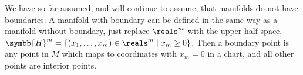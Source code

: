 \documentclass[fleqn]{NotesClass}
\begin{document}
    \begin{remark}{}{}
        We have so far assumed, and will continue to assume, that manifolds do not have boundaries.
        A manifold with boundary can be defined in the same way as a manifold without boundary, just replace \(\reals^m\) with the upper half space, \(\symbb{H}^m = \{(x_1, \dotsc, x_m) \in \reals^m \mid x_m \ge 0\}\).
        Then a boundary point is any point in \(M\) which maps to coordinates with \(x_m = 0\) in a chart, and all other points are interior points.
    \end{remark}
    
    
    
    
    
%        
%
	\backmatter
	\renewcommand{\glossaryname}{Acronyms}
	\printglossary[acronym]
	\printindex
\end{document}

